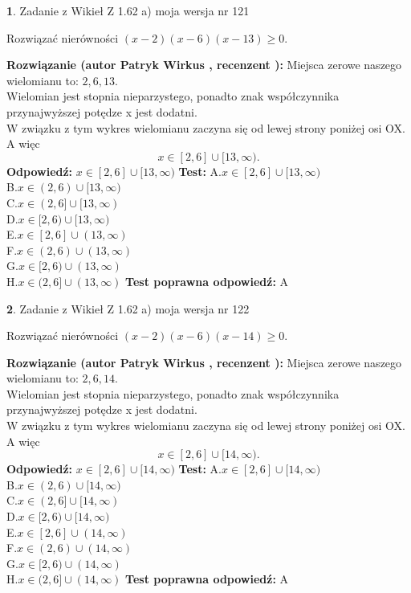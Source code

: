 \documentclass[12pt, a4paper]{article}
\theoremstyle{definition} %
\newtheorem{zad}{}
\newcommand{\zadStart}[1]{\begin{zad}#1\newline}
\newcommand{\zadStop}{\end{zad}}
\newcommand{\rozwStart}[2]{\noindent \textbf{Rozwiązanie (autor #1 , recenzent #2): }\newline}
\newcommand{\rozwStop}{\newline}
\newcommand{\odpStart}{\noindent \textbf{Odpowiedź:}\newline}
\newcommand{\odpStop}{\newline}
\newcommand{\testStart}{\noindent \textbf{Test:}\newline}
\newcommand{\testStop}{\newline}
\newcommand{\kluczStart}{\noindent \textbf{Test poprawna odpowiedź:}\newline}
\newcommand{\kluczStop}{\newline}
\begin{document}
\zadStart{Zadanie z Wikieł Z 1.62 a) moja wersja nr 121}

Rozwiązać nierówności $(x-2)(x-6)(x-13)\ge0$.
\zadStop
\rozwStart{Patryk Wirkus}{}
Miejsca zerowe naszego wielomianu to: $2, 6, 13$.\\
Wielomian jest stopnia nieparzystego, ponadto znak współczynnika przy\linebreak najwyższej potędze x jest dodatni.\\ W związku z tym wykres wielomianu zaczyna się od lewej strony poniżej osi OX. A więc $$x \in [2,6] \cup [13,\infty).$$
\rozwStop
\odpStart
$x \in [2,6] \cup [13,\infty)$
\odpStop
\testStart
A.$x \in [2,6] \cup [13,\infty)$\\
B.$x \in (2,6) \cup [13,\infty)$\\
C.$x \in (2,6] \cup [13,\infty)$\\
D.$x \in [2,6) \cup [13,\infty)$\\
E.$x \in [2,6] \cup (13,\infty)$\\
F.$x \in (2,6) \cup (13,\infty)$\\
G.$x \in [2,6) \cup (13,\infty)$\\
H.$x \in (2,6] \cup (13,\infty)$
\testStop
\kluczStart
A
\kluczStop



\zadStart{Zadanie z Wikieł Z 1.62 a) moja wersja nr 122}

Rozwiązać nierówności $(x-2)(x-6)(x-14)\ge0$.
\zadStop
\rozwStart{Patryk Wirkus}{}
Miejsca zerowe naszego wielomianu to: $2, 6, 14$.\\
Wielomian jest stopnia nieparzystego, ponadto znak współczynnika przy\linebreak najwyższej potędze x jest dodatni.\\ W związku z tym wykres wielomianu zaczyna się od lewej strony poniżej osi OX. A więc $$x \in [2,6] \cup [14,\infty).$$
\rozwStop
\odpStart
$x \in [2,6] \cup [14,\infty)$
\odpStop
\testStart
A.$x \in [2,6] \cup [14,\infty)$\\
B.$x \in (2,6) \cup [14,\infty)$\\
C.$x \in (2,6] \cup [14,\infty)$\\
D.$x \in [2,6) \cup [14,\infty)$\\
E.$x \in [2,6] \cup (14,\infty)$\\
F.$x \in (2,6) \cup (14,\infty)$\\
G.$x \in [2,6) \cup (14,\infty)$\\
H.$x \in (2,6] \cup (14,\infty)$
\testStop
\kluczStart
A
\kluczStop
\end{document}
